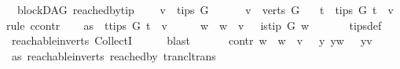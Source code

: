 \begin{isabellebody}
\ {\isacharparenleft}{\kern0pt}\ blockDAG{\isacharparenright}{\kern0pt}\ reached{\isacharunderscore}{\kern0pt}by{\isacharunderscore}{\kern0pt}tip{\isacharcolon}{\kern0pt}\ \isanewline
\ \ \ {\isachardoublequoteopen}v\ {\isasymnotin}\ tips\ G{\isachardoublequoteclose}\isanewline
\ \ \ \ \ \ {\isachardoublequoteopen}v\ {\isasymin}\ verts\ G{\isachardoublequoteclose}\isanewline
\ \ \ {\isachardoublequoteopen}{\isasymexists}t\ {\isasymin}\ tips\ G{\isachardot}{\kern0pt}\ t\ {\isasymrightarrow}\isactrlsup {\isacharplus}{\kern0pt}\ v{\isachardoublequoteclose}\ \isanewline
%
\isadelimproof
%
\endisadelimproof
%
\isatagproof
{}\isamarkupfalse%
{\isacharparenleft}{\kern0pt}rule\ ccontr{\isacharparenright}{\kern0pt}\isanewline
\ \ \isamarkupfalse%
\ as{}{\isacharcolon}{\kern0pt}\ {\isachardoublequoteopen}{\isasymnot}\ {\isacharparenleft}{\kern0pt}{\isasymexists}t{\isasymin}tips\ G{\isachardot}{\kern0pt}\ t\ {\isasymrightarrow}\isactrlsup {\isacharplus}{\kern0pt}\ v{\isacharparenright}{\kern0pt}{\isachardoublequoteclose}\isanewline
\ \ \isamarkupfalse%
\ \isamarkupfalse%
\ {\isachardoublequoteopen}{\isasymforall}w{\isachardot}{\kern0pt}\ \ w\ {\isasymrightarrow}\isactrlsup {\isacharplus}{\kern0pt}\ v\ {\isasymlongrightarrow}\ {\isasymnot}\ is{\isacharunderscore}{\kern0pt}tip\ G\ w{\isachardoublequoteclose}\ \isanewline
\ \ \ \ \isamarkupfalse%
\ tips{\isacharunderscore}{\kern0pt}def\ \isamarkupfalse%
\ reachable{}{\isacharunderscore}{\kern0pt}in{\isacharunderscore}{\kern0pt}verts{\isacharparenleft}{\kern0pt}{}{\isacharparenright}{\kern0pt}\ CollectI\isanewline
\ \ \ \ \isamarkupfalse%
\ blast\ \isanewline
\ \ \isamarkupfalse%
\ \isamarkupfalse%
\ contr{\isacharcolon}{\kern0pt}\ {\isachardoublequoteopen}{\isasymforall}w{\isachardot}{\kern0pt}\ \ w\ {\isasymrightarrow}\isactrlsup {\isacharplus}{\kern0pt}\ v\ {\isasymlongrightarrow}\ \ {\isacharparenleft}{\kern0pt}{\isasymexists}y{\isachardot}{\kern0pt}\ y{\isasymrightarrow}\isactrlsup {\isacharplus}{\kern0pt}w\ {\isasymand}\ \ y{\isasymrightarrow}\isactrlsup {\isacharplus}{\kern0pt}v{\isacharparenright}{\kern0pt}{\isachardoublequoteclose}\isanewline
\ \ \ \ \isamarkupfalse%
\ as{}\ reachable{}{\isacharunderscore}{\kern0pt}in{\isacharunderscore}{\kern0pt}verts{\isacharparenleft}{\kern0pt}{}{\isacharparenright}{\kern0pt}\ reached{\isacharunderscore}{\kern0pt}by\ trancl{\isacharunderscore}{\kern0pt}trans\ \isanewline

\end{isabellebody}
